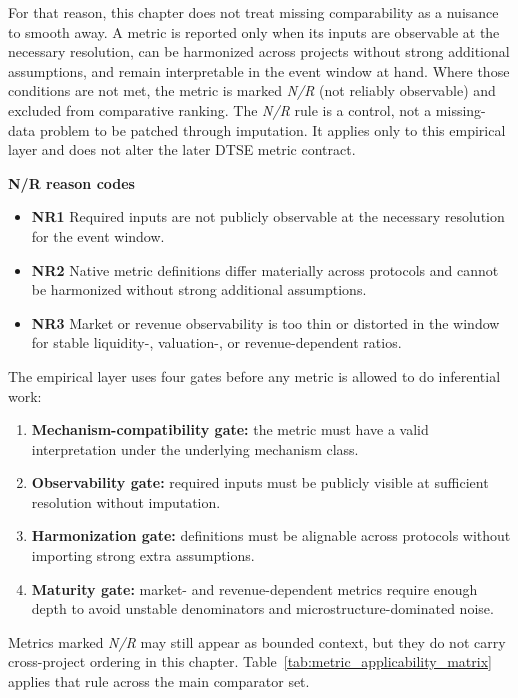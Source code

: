 For that reason, this chapter does not treat missing comparability as a nuisance to smooth away. A metric is reported only when its inputs are observable at the necessary resolution, can be harmonized across projects without strong additional assumptions, and remain interpretable in the event window at hand. Where those conditions are not met, the metric is marked \emph{N/R} (not reliably observable) and excluded from comparative ranking. The \emph{N/R} rule is a control, not a missing-data problem to be patched through imputation. It applies only to this empirical layer and does not alter the later DTSE metric contract.

\noindent\textbf{N/R reason codes}
\begin{itemize}
    \item \textbf{NR1} Required inputs are not publicly observable at the necessary resolution for the event window.
    \item \textbf{NR2} Native metric definitions differ materially across protocols and cannot be harmonized without strong additional assumptions.
    \item \textbf{NR3} Market or revenue observability is too thin or distorted in the window for stable liquidity-, valuation-, or revenue-dependent ratios.
\end{itemize}

The empirical layer uses four gates before any metric is allowed to do inferential work:
\begin{enumerate}
    \item \textbf{Mechanism-compatibility gate:} the metric must have a valid interpretation under the underlying mechanism class.
    \item \textbf{Observability gate:} required inputs must be publicly visible at sufficient resolution without imputation.
    \item \textbf{Harmonization gate:} definitions must be alignable across protocols without importing strong extra assumptions.
    \item \textbf{Maturity gate:} market- and revenue-dependent metrics require enough depth to avoid unstable denominators and microstructure-dominated noise.
\end{enumerate}

Metrics marked \emph{N/R} may still appear as bounded context, but they do not carry cross-project ordering in this chapter. Table~\ref{tab:metric_applicability_matrix} applies that rule across the main comparator set.

